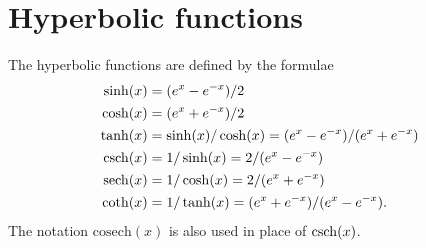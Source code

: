 \documentclass[a4paper]{book}
\theoremstyle{definition}
\begin{document}
\section{Hyperbolic functions}
\label{sec-hyp}

The hyperbolic functions are defined by the formulae
\begin{align*}
 \sinh(x) &= (e^x - e^{-x})/2 \\
 \cosh(x) &= (e^x + e^{-x})/2 \\
 \tanh(x) &= \sinh(x)/\cosh(x) = (e^x-e^{-x})/(e^x+e^{-x}) \\
 \operatorname{csch}(x) &= 1/\sinh(x) = 2/(e^x-e^{-x}) \\
 \operatorname{sech}(x) &= 1/\cosh(x) = 2/(e^x+e^{-x}) \\
 \coth(x) &= 1/\tanh(x) = (e^x+e^{-x})/(e^x-e^{-x}).
\end{align*}
The notation $\text{cosech}(x)$ is also used in place of $\operatorname{csch}(x)$.
\end{document}
